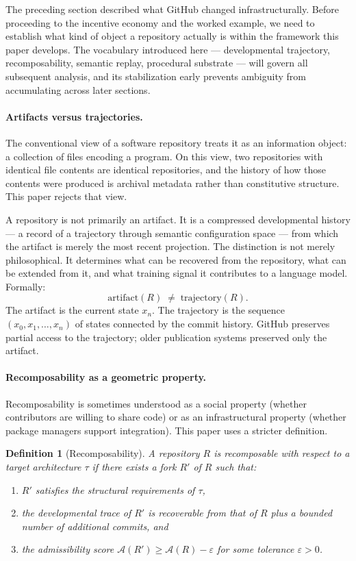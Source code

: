 \documentclass[11pt]{article}
\newtheorem{definition}[theorem]{Definition}
\begin{document}
The preceding section described what GitHub changed infrastructurally. Before
proceeding to the incentive economy and the worked example, we need to establish
what kind of object a repository actually is within the framework this paper
develops. The vocabulary introduced here --- developmental trajectory,
recomposability, semantic replay, procedural substrate --- will govern all
subsequent analysis, and its stabilization early prevents ambiguity from
accumulating across later sections.

\paragraph{Artifacts versus trajectories.}
The conventional view of a software repository treats it as an information
object: a collection of files encoding a program. On this view, two repositories
with identical file contents are identical repositories, and the history of
how those contents were produced is archival metadata rather than constitutive
structure. This paper rejects that view.

A repository is not primarily an artifact. It is a compressed developmental
history --- a record of a trajectory through semantic configuration space ---
from which the artifact is merely the most recent projection. The distinction
is not merely philosophical. It determines what can be recovered from the
repository, what can be extended from it, and what training signal it
contributes to a language model. Formally:
\[
\text{artifact}(R) \;\neq\; \text{trajectory}(R).
\]
The artifact is the current state $x_n$. The trajectory is the sequence
$(x_0, x_1, \ldots, x_n)$ of states connected by the commit history. GitHub
preserves partial access to the trajectory; older publication systems preserved
only the artifact.

\paragraph{Recomposability as a geometric property.}
Recomposability is sometimes understood as a social property (whether
contributors are willing to share code) or as an infrastructural property
(whether package managers support integration). This paper uses a stricter
definition.

\begin{definition}[Recomposability]
\label{def:recomposability}
A repository $R$ is \emph{recomposable} with respect to a target architecture
$\tau$ if there exists a fork $R'$ of $R$ such that:
\begin{enumerate}
\item $R'$ satisfies the structural requirements of $\tau$,
\item the developmental trace of $R'$ is recoverable from that of $R$ plus
a bounded number of additional commits, and
\item the admissibility score $\mathcal{A}(R') \geq \mathcal{A}(R) - \varepsilon$
for some tolerance $\varepsilon > 0$.
\end{enumerate}
\end{definition}
\end{document}
